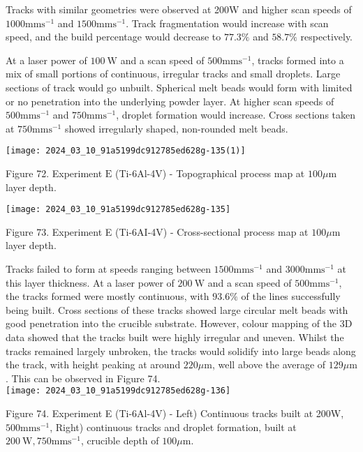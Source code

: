 \documentclass[10pt]{article}
\begin{document}
Tracks with similar geometries were observed at 200W and higher scan speeds of $1000 \mathrm{mms}^{-1}$ and $1500 \mathrm{mms}^{-1}$. Track fragmentation would increase with scan speed, and the build percentage would decrease to $77.3 \%$ and $58.7 \%$ respectively.

At a laser power of $100 \mathrm{~W}$ and a scan speed of $500 \mathrm{mms}^{-1}$, tracks formed into a mix of small portions of continuous, irregular tracks and small droplets. Large sections of track would go unbuilt. Spherical melt beads would form with limited or no penetration into the underlying powder layer. At higher scan speeds of $500 \mathrm{mms}^{-1}$ and $750 \mathrm{mms}^{-1}$, droplet formation would increase. Cross sections taken at $750 \mathrm{mms}^{-1}$ showed irregularly shaped, non-rounded melt beads.

\begin{center}
\texttt{[image: 2024\_03\_10\_91a5199dc912785ed628g-135(1)]}
\end{center}

Figure 72. Experiment $\mathrm{E}$ (Ti-6Al-4V) - Topographical process map at $100 \mu \mathrm{m}$ layer depth.

\begin{center}
\texttt{[image: 2024\_03\_10\_91a5199dc912785ed628g-135]}
\end{center}

Figure 73. Experiment E (Ti-6AI-4V) - Cross-sectional process map at $100 \mu \mathrm{m}$ layer depth.

Tracks failed to form at speeds ranging between $1500 \mathrm{mms}^{-1}$ and $3000 \mathrm{mms}^{-1}$ at this layer thickness. At a laser power of $200 \mathrm{~W}$ and a scan speed of $500 \mathrm{mms}^{-1}$, the tracks formed were mostly continuous, with $93.6 \%$ of the lines successfully being built. Cross sections of these tracks showed large circular melt beads with good penetration into the crucible substrate. However, colour mapping of the 3D data showed that the tracks built were highly irregular and uneven. Whilst the tracks remained largely unbroken, the tracks would solidify into large beads along the track, with height peaking at around $220 \mu \mathrm{m}$, well above the average of $129 \mu \mathrm{m}$. This can be observed in Figure 74.\\
\texttt{[image: 2024\_03\_10\_91a5199dc912785ed628g-136]}

Figure 74. Experiment E (Ti-6Al-4V) - Left) Continuous tracks built at 200W, $500 \mathrm{mms}^{-1}$, Right) continuous tracks and droplet formation, built at $200 \mathrm{~W}, 750 \mathrm{mms}^{-1}$, crucible depth of $100 \mu \mathrm{m}$.
\end{document}
